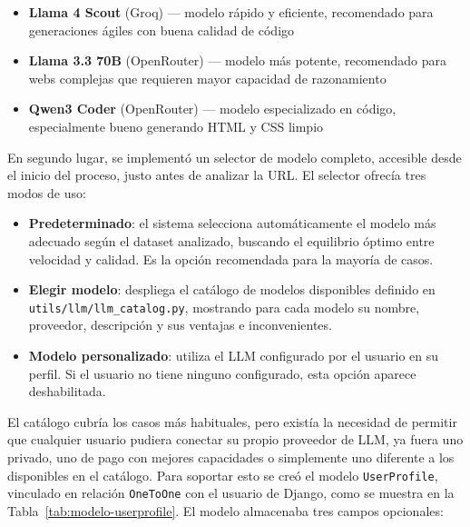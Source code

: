 \begin{itemize}
    \item \textbf{Llama 4 Scout} (Groq) — modelo rápido y eficiente, recomendado para generaciones ágiles con buena calidad de código
    \item \textbf{Llama 3.3 70B} (OpenRouter) — modelo más potente, recomendado para webs complejas que requieren mayor capacidad de razonamiento
    \item \textbf{Qwen3 Coder} (OpenRouter) — modelo especializado en código, especialmente bueno generando HTML y CSS limpio
\end{itemize}


En segundo lugar, se implementó un selector de modelo completo, accesible desde el inicio del proceso, justo antes de analizar la URL. El selector ofrecía tres modos de uso:

\begin{itemize}
    \item \textbf{Predeterminado}: el sistema selecciona automáticamente el 
    modelo más adecuado según el dataset analizado, buscando el equilibrio 
    óptimo entre velocidad y calidad. Es la opción recomendada para la 
    mayoría de casos.
    
    \item \textbf{Elegir modelo}: despliega el catálogo de modelos disponibles 
    definido en \\ \texttt{utils/llm/llm\_catalog.py}, mostrando para cada modelo 
    su nombre, proveedor, descripción y sus ventajas e inconvenientes.
    
    \item \textbf{Modelo personalizado}: utiliza el LLM configurado por el 
    usuario en su perfil. Si el usuario no tiene ninguno configurado, esta 
    opción aparece deshabilitada.
\end{itemize}

El catálogo cubría los casos más habituales, pero existía la necesidad de 
permitir que cualquier usuario pudiera conectar su propio proveedor de LLM, 
ya fuera uno privado, uno de pago con mejores capacidades o simplemente uno 
diferente a los disponibles en el catálogo. Para soportar esto se creó el 
modelo \texttt{UserProfile}, vinculado en relación \texttt{OneToOne} con el 
usuario de Django, como se muestra en la Tabla~\ref{tab:modelo-userprofile}. 
El modelo almacenaba tres campos opcionales:

